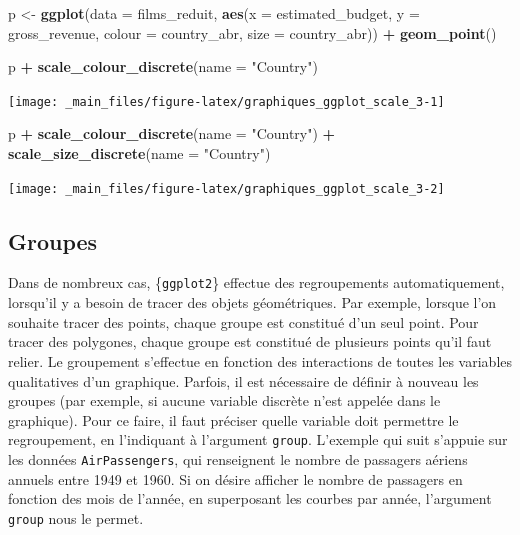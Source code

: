 \documentclass[
  11pt,
]{book}
\newenvironment{Shaded}{\begin{snugshade}}{\end{snugshade}}
\newcommand{\DataTypeTok}[1]{\textcolor[rgb]{0.13,0.29,0.53}{#1}}
\newcommand{\KeywordTok}[1]{\textcolor[rgb]{0.13,0.29,0.53}{\textbf{#1}}}
\newcommand{\NormalTok}[1]{#1}
\newcommand{\OperatorTok}[1]{\textcolor[rgb]{0.81,0.36,0.00}{\textbf{#1}}}
\newcommand{\StringTok}[1]{\textcolor[rgb]{0.31,0.60,0.02}{#1}}
\numberwithin{equation}{section}
\numberwithin{countremarque}{section}
\begin{document}
\begin{Shaded}
\begin{Highlighting}[]
\NormalTok{p \textless{}{-}}\StringTok{ }\KeywordTok{ggplot}\NormalTok{(}\DataTypeTok{data =}\NormalTok{ films\_reduit,}
            \KeywordTok{aes}\NormalTok{(}\DataTypeTok{x =}\NormalTok{ estimated\_budget, }\DataTypeTok{y =}\NormalTok{ gross\_revenue,}
                \DataTypeTok{colour =}\NormalTok{ country\_abr, }\DataTypeTok{size =}\NormalTok{ country\_abr)) }\OperatorTok{+}
\StringTok{              }\KeywordTok{geom\_point}\NormalTok{()}

\NormalTok{p }\OperatorTok{+}\StringTok{ }\KeywordTok{scale\_colour\_discrete}\NormalTok{(}\DataTypeTok{name =} \StringTok{"Country"}\NormalTok{)}
\end{Highlighting}
\end{Shaded}

\begin{center}\texttt{[image: \_main\_files/figure-latex/graphiques\_ggplot\_scale\_3-1]} \end{center}

\begin{Shaded}
\begin{Highlighting}[]
\NormalTok{p }\OperatorTok{+}\StringTok{ }\KeywordTok{scale\_colour\_discrete}\NormalTok{(}\DataTypeTok{name =} \StringTok{"Country"}\NormalTok{) }\OperatorTok{+}
\StringTok{  }\KeywordTok{scale\_size\_discrete}\NormalTok{(}\DataTypeTok{name =} \StringTok{"Country"}\NormalTok{)}
\end{Highlighting}
\end{Shaded}

\begin{center}\texttt{[image: \_main\_files/figure-latex/graphiques\_ggplot\_scale\_3-2]} \end{center}

\hypertarget{graphiques_ggplot_group}{%
\subsection{Groupes}\label{graphiques_ggplot_group}}

Dans de nombreux cas, \{\texttt{ggplot2}\} effectue des regroupements automatiquement, lorsqu'il y a besoin de tracer des objets géométriques. Par exemple, lorsque l'on souhaite tracer des points, chaque groupe est constitué d'un seul point. Pour tracer des polygones, chaque groupe est constitué de plusieurs points qu'il faut relier. Le groupement s'effectue en fonction des interactions de toutes les variables qualitatives d'un graphique. Parfois, il est nécessaire de définir à nouveau les groupes (par exemple, si aucune variable discrète n'est appelée dans le graphique). Pour ce faire, il faut préciser quelle variable doit permettre le regroupement, en l'indiquant à l'argument \texttt{group}. L'exemple qui suit s'appuie sur les données \texttt{AirPassengers}, qui renseignent le nombre de passagers aériens annuels entre 1949 et 1960. Si on désire afficher le nombre de passagers en fonction des mois de l'année, en superposant les courbes par année, l'argument \texttt{group} nous le permet.
\end{document}

